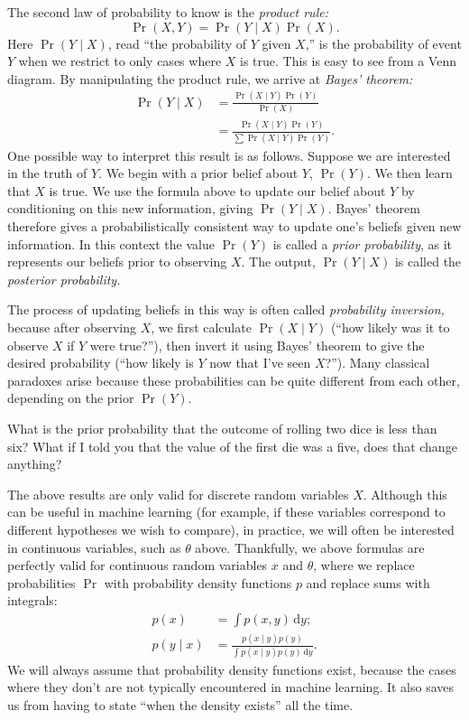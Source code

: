 \documentclass{article}
\newcommand{\given}{\mid}
\newcommand{\intd}[1]{\,\mathrm{d}{#1}}
\begin{document}
The second law of probability to know is the \emph{product rule:}
\begin{equation*}
  \Pr(X, Y) = \Pr(Y \given X)\Pr(X).
\end{equation*}
Here $\Pr(Y \given X)$, read ``the probability of $Y$ given $X$,'' is
the probability of event $Y$ when we restrict to only cases where $X$
is true.  This is easy to see from a Venn diagram.  By manipulating
the product rule, we arrive at \emph{Bayes' theorem:}
\begin{align*}
  \Pr(Y \given X) &= \frac{\Pr(X \given Y)\Pr(Y)}{\Pr(X)} \\
                  &= \frac{\Pr(X \given Y)\Pr(Y)}{\sum \Pr(X \given Y)\Pr(Y)}.
\end{align*}
One possible way to interpret this result is as follows.  Suppose we
are interested in the truth of $Y$.  We begin with a prior belief
about $Y$, $\Pr(Y)$.  We then learn that $X$ is true.  We use the
formula above to update our belief about $Y$ by conditioning on this
new information, giving $\Pr(Y \given X)$.  Bayes' theorem therefore
gives a probabilistically consistent way to update one's beliefs given
new information.  In this context the value $\Pr(Y)$ is called a
\emph{prior probability}, as it represents our beliefs prior to
observing $X$.  The output, $\Pr(Y \given X)$ is called the
\emph{posterior probability.}

The process of updating beliefs in this way is often called
\emph{probability inversion,} because after observing $X$, we first
calculate $\Pr(X \given Y)$ (``how likely was it to observe $X$ if $Y$
were true?''), then invert it using Bayes' theorem to give the desired
probability (``how likely is $Y$ now that I've seen $X$?'').  Many
classical paradoxes arise because these probabilities can be quite
different from each other, depending on the prior $\Pr(Y)$.

What is the prior probability that the outcome of rolling two dice is
less than six?  What if I told you that the value of the first die was
a five, does that change anything?

The above results are only valid for discrete random variables $X$.
Although this can be useful in machine learning (for example, if these
variables correspond to different hypotheses we wish to compare), in
practice, we will often be interested in continuous variables, such as
$\theta$ above.  Thankfully, we above formulas are perfectly valid for
continuous random variables $x$ and $\theta$, where we replace
probabilities $\Pr$ with probability density functions $p$ and replace
sums with integrals:
\begin{align*}
  p(x) &= \int p(x, y) \intd{y}; \\
  p(y \given x) &= \frac{p(x \given y) p(y)}{\int p(x \given y) p(y) \intd{y}}.
\end{align*}
We will always assume that probability density functions exist,
because the cases where they don't are not typically encountered in
machine learning.  It also saves us from having to state ``when the
density exists'' all the time.
\end{document}
